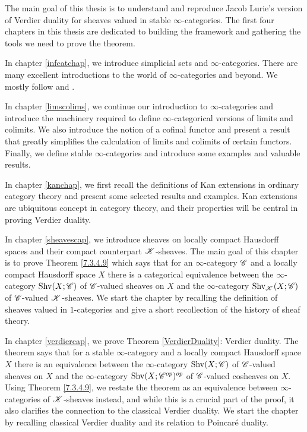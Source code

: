 \documentclass[../../thesis.tex]{subfiles}
\begin{document}
The main goal of this thesis is to understand and reproduce Jacob Lurie's version of Verdier duality for sheaves valued in stable $\infty$-categories.
The first four chapters in this thesis are dedicated to building the framework and gathering the tools we need to prove the theorem.


In chapter \ref{infcatchap}, we introduce simplicial sets and $\infty$-categories.
There are many excellent introductions to the world of $\infty$-categories and beyond.
We mostly follow \cite{kerodon} and \cite{Rezk}.


In chapter \ref{limscolims}, we continue our introduction to $\infty$-categories and introduce the machinery required to define $\infty$-categorical versions of limits and colimits.
We also introduce the notion of a cofinal functor and present a result that greatly simplifies the calculation of limits and colimits of certain functors.
Finally, we define stable $\infty$-categories and introduce some examples and valuable results.


In chapter \ref{kanchap}, we first recall the definitions of Kan extensions in ordinary category theory and present some selected results and examples.
Kan extensions are ubiquitous concept in category theory, and their properties will be central in proving Verdier duality.


In chapter \ref{sheavescap}, we introduce sheaves on locally compact Hausdorff spaces and their compact counterpart $\mathscr{K}$-sheaves.
The main goal of this chapter is to prove Theorem \ref{7.3.4.9} which says that for an $\infty$-category $\mathscr{C}$ and a locally compact Hausdorff space $X$ there is a categorical equivalence between the $\infty$-category $\mathrm{Shv}(X;\mathscr{C})$ of $\mathscr{C}$-valued sheaves on $X$ and the $\infty$-category $\mathrm{Shv}_{\mathscr{K}}(X;\mathscr{C})$ of $\mathscr{C}$-valued $\mathscr{K}$-sheaves.
We start the chapter by recalling the definition of sheaves valued in $1$-categories and give a short recollection of the history of sheaf theory.

In chapter \ref{verdiercap}, we prove Theorem \ref{VerdierDuality}: Verdier duality.
The theorem says that for a stable $\infty$-category and a locally compact Hausdorff space $X$ there is an equivalence between the $\infty$-category $\mathrm{Shv}(X;\mathscr{C})$ of $\mathscr{C}$-valued sheaves on $X$ and the $\infty$-category $\mathrm{Shv}(X;\mathscr{C}^{op})^{op}$ of $\mathscr{C}$-valued cosheaves on $X$.
Using Theorem \ref{7.3.4.9}, we restate the theorem as an equivalence between $\infty$-categories of $\mathscr{K}$-sheaves instead, and while this is a crucial part of the proof, it also clarifies the connection to the classical Verdier duality.
We start the chapter by recalling classical Verdier duality and its relation to Poincaré duality.
\end{document}
